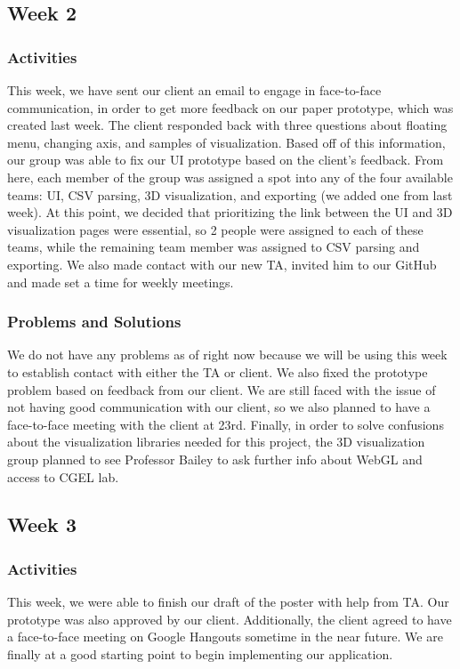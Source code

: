 \documentclass[journal,10pt,onecolumn,compsoc]{IEEEtran} \usepackage[margin=1.0in]{geometry} \usepackage{pdfpages}
\begin{document}
\subsection{Week 2}
    \subsubsection{Activities}
    This week, we have sent our client an email to engage in face-to-face communication, in order to get more feedback on our paper prototype, which was created last week. The client responded back with three questions about floating menu, changing axis, and samples of visualization. Based off of this information, our group was able to fix our UI prototype based on the client's feedback. From here, each member of the group was assigned a spot into any of the four available teams: UI, CSV parsing, 3D visualization, and exporting (we added one from last week). At this point, we decided that prioritizing the link between the UI and 3D visualization pages were essential, so 2 people were assigned to each of these teams, while the remaining team member was assigned to CSV parsing and exporting. We also made contact with our new TA, invited him to our GitHub and made set a time for weekly meetings.
    \subsubsection{Problems and Solutions}
    We do not have any problems as of right now because we will be using this week to establish contact with either the TA or client. We also fixed the prototype problem based on feedback from our client. We are still faced with the issue of not having good communication with our client, so we also planned to have a face-to-face meeting with the client at 23rd. Finally, in order to solve confusions about the visualization libraries needed for this project, the 3D visualization group planned to see Professor Bailey to ask further info about WebGL and access to CGEL lab.
    
\subsection{Week 3}
    \subsubsection{Activities}
    This week, we were able to finish our draft of the poster with help from TA. Our prototype was also approved by our client. Additionally, the client agreed to have a face-to-face meeting on Google Hangouts sometime in the near future. We are finally at a good starting point to begin implementing our application.
\end{document}
